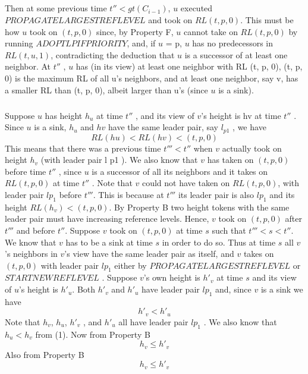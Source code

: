 \subparagraph{}Then at some previous time $t'' < gt(C_{i-1})$, $u$ executed $PROPAGATELARGESTREFLEVEL$ and took on $RL (t, p, 0)$. This must be how $u$ took on $(t, p, 0)$ since, by Property F, $u$ cannot take on $RL (t, p, 0)$ by running $ADOPTLPIFPRIORITY$, and, if $u$ = p, $u$ has no predecessors in $RL (t, u, 1)$, contradicting the deduction that $u$ is a successor of at least one neighbor. At $t''$ , $u$ has (in its view) at least one neighbor with RL (t, p, 0), (t, p, 0) is the maximum RL of all u's neighbors, and at least one neighbor, say v, has a smaller RL than (t, p, 0), albeit larger than u's (since $u$ is a sink).
\subparagraph{}Suppose $u$ has height $h_u$ at time $t''$ , and its view of $v$'s height is hv at time $t''$ . Since $u$ is a sink, $h_u$ and $hv$ have the same leader pair, say $l_{p1}$ , we have
\begin{equation}
RL(hu ) < RL(hv ) < (t, p, 0)
\end{equation}
This means that there was a previous time $t ''' < t ''$ when $v$ actually took on height $h_v$ (with leader pair l p1 ). We also know that $v$ has taken on $(t, p, 0)$ before time $t ''$ , since $u$ is a successor of all its neighbors and it takes on $RL (t, p, 0)$ at time $t ''$ . Note that $v$ could not have taken on $RL (t, p, 0)$, with leader pair $lp_1$ before $t '''$. This is because at $t '''$ its leader pair is also $lp_1$ and its height $RL(h_v ) < (t, p, 0)$. By Property B two height tokens with the same leader pair must have increasing reference levels. Hence, $v$ took on $(t, p, 0)$ after $t '''$ and before $t ''$. Suppose $v$ took on $(t, p, 0)$ at time $s$ such that $t ''' < s < t ''$. We know that $v$ has to be a sink at time $s$ in order to do so. Thus at time $s$ all $v$'s neighbors in $v$'s view have the same leader pair as itself, and $v$ takes on $(t, p, 0)$ with leader pair $lp_1$ either by $PROPAGATELARGESTREFLEVEL$ or $STARTNEWREFLEVEL$ . Suppose $v$'s own height is $h'_v$ at time $s$ and its view of $u$'s height is $h'_u$. Both $h'_v$ and $h'_u$ have leader pair $lp_1$ and, since $v$ is a sink we have
\begin{equation}
h'_v < h'_u
\end{equation}
Note that $h_v$, $h_u$, $h'_v$ , and $h'_u$ all have leader pair $lp_1$ . We also know that $h_u < h_v$ from (1). Now from Property B
\begin{equation}
h_v \leq h'_v
\end{equation}
Also from Property B
\begin{equation}
h_v \leq h'_v
\end{equation}
